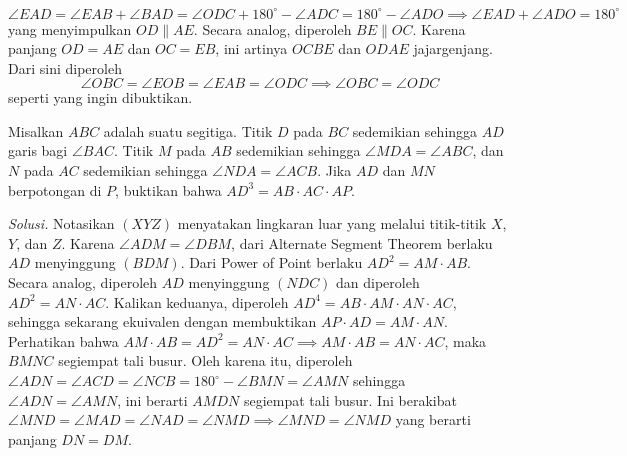 \documentclass[12pt]{scrartcl}
\begin{document}
\[\angle EAD = \angle EAB+\angle BAD = \angle ODC + 180^\circ - \angle ADC = 180^\circ - \angle ADO\implies \angle EAD+\angle ADO = 180^\circ\]
yang menyimpulkan $OD\parallel AE$. Secara analog, diperoleh $BE\parallel OC$. Karena panjang $OD=AE$ dan $OC=EB$, ini artinya $OCBE$ dan $ODAE$ jajargenjang. Dari sini diperoleh
\[\angle OBC = \angle EOB = \angle EAB = \angle ODC\implies \angle OBC=\angle ODC\]
seperti yang ingin dibuktikan.
\begin{center}
\end{center}
\newpage
\begin{tcolorbox}[title=\textbf{Soal 5: OSN 2014/6}]
Misalkan $ABC$ adalah suatu segitiga. Titik $D$ pada $BC$ sedemikian sehingga $AD$ garis bagi $\angle BAC$. Titik $M$ pada $AB$ sedemikian sehingga $\angle MDA=\angle ABC$, dan $N$ pada $AC$ sedemikian sehingga $\angle NDA=\angle ACB$. Jika $AD$ dan $MN$ berpotongan di $P$, buktikan bahwa $AD^3=AB\cdot AC\cdot AP$.
\end{tcolorbox}
\noindent\textit{Solusi.} Notasikan $(XYZ)$ menyatakan lingkaran luar yang melalui titik-titik $X$, $Y$, dan $Z$. Karena $\angle ADM=\angle DBM$, dari Alternate Segment Theorem berlaku $AD$ menyinggung $(BDM)$. Dari Power of Point berlaku $AD^2=AM\cdot AB$. Secara analog, diperoleh $AD$ menyinggung $(NDC)$ dan diperoleh $AD^2=AN\cdot AC$. Kalikan keduanya, diperoleh $AD^4 = AB\cdot AM\cdot AN\cdot AC$, sehingga sekarang ekuivalen dengan membuktikan $AP\cdot AD=AM\cdot AN$.\\
Perhatikan bahwa $AM\cdot AB=AD^2 = AN\cdot AC\implies AM\cdot AB=AN\cdot AC$, maka $BMNC$ segiempat tali busur. Oleh karena itu, diperoleh $\angle ADN=\angle ACD=\angle NCB = 180^\circ - \angle BMN = \angle AMN$ sehingga $\angle ADN=\angle AMN$, ini berarti $AMDN$ segiempat tali busur. Ini berakibat $\angle MND=\angle MAD=\angle NAD=\angle NMD\implies \angle MND=\angle NMD$ yang berarti panjang $DN=DM$.\\
\end{document}
